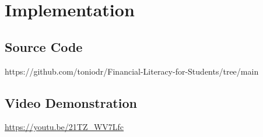 \clearpage
\section*{Implementation}
{}

\subsection*{Source Code}
{}

https://github.com/toniodr/Financial-Literacy-for-Students/tree/main

\subsection*{Video Demonstration}

\href{https://youtu.be/21TZ_WV7Lfc}{https://youtu.be/21TZ\_WV7Lfc}

{}
